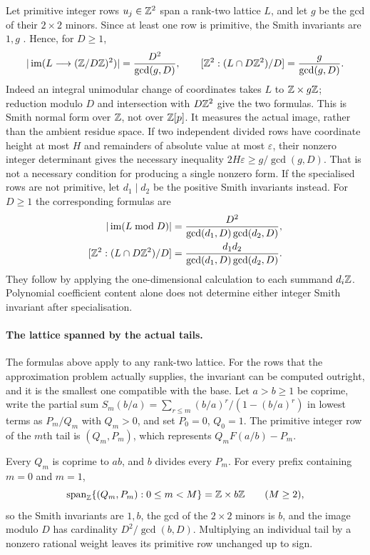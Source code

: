\documentclass[11pt]{article}
\begin{document}
Let primitive integer rows $u_j\in\mathbb{Z}^2$ span a rank-two lattice $L$, and
let $g$ be the gcd of their $2\times2$ minors. Since at least one row is
primitive, the Smith invariants are $1,g$
\cite[Thms.~2.3--2.4, p.~3]{stanley2016}. Hence, for $D\ge1$,
\[
 |\operatorname{im}(L\longrightarrow(\mathbb{Z}/D\mathbb{Z})^2)|
 =\frac{D^2}{\gcd(g,D)},\qquad
 [\mathbb{Z}^2:(L\cap D\mathbb{Z}^2)/D]=\frac{g}{\gcd(g,D)}.
\]
Indeed an integral unimodular change of coordinates takes $L$ to
$\mathbb{Z}\times g\mathbb{Z}$; reduction modulo $D$ and intersection with $D\mathbb{Z}^2$
give the two formulas. This is Smith normal form over $\mathbb{Z}$, not over
$\mathbb{Z}[p]$. It measures the actual image, rather than the ambient residue space. If two independent divided rows have coordinate height at most
$H$ and remainders of absolute value at most $\varepsilon$, their nonzero
integer determinant gives the necessary inequality
$2H\varepsilon\ge g/\gcd(g,D)$. That is not a necessary condition for
producing a single nonzero form.
If the specialised rows are not primitive, let $d_1\mid d_2$ be the
positive Smith invariants instead. For $D\ge1$ the corresponding formulas are
\[
\begin{aligned}
 |\operatorname{im}(L\bmod D)|
 &=\frac{D^2}{\gcd(d_1,D)\gcd(d_2,D)},\\
 [\Z^2:(L\cap D\Z^2)/D]
 &=\frac{d_1d_2}{\gcd(d_1,D)\gcd(d_2,D)}.
\end{aligned}
\]
They follow by applying the one-dimensional calculation to each summand
$d_i\mathbb{Z}$. Polynomial coefficient content alone does not determine either
integer Smith invariant after specialisation.

\paragraph{The lattice spanned by the actual tails.}
The formulas above apply to any rank-two lattice. For the rows that the
approximation problem actually supplies, the invariant can be computed
outright, and it is the smallest one compatible with the base. Let $a>b\ge1$ be
coprime, write the partial sum $S_m(b/a)=\sum_{r\le m}(b/a)^r/(1-(b/a)^r)$ in
lowest terms as $P_m/Q_m$ with $Q_m>0$, and set $P_0=0$, $Q_0=1$. The primitive
integer row of the $m$th tail is $(Q_m,P_m)$, which represents
$Q_mF(a/b)-P_m$.

\begin{proposition}
\label{long1049:res:tail-lattice}
Every $Q_m$ is coprime to $ab$, and $b$ divides every $P_m$. For every prefix
containing $m=0$ and $m=1$,
\[
 \operatorname{span}_{\mathbb{Z}}\{(Q_m,P_m):0\le m<M\}=\mathbb{Z}\times b\mathbb{Z}
 \qquad(M\ge2),
\]
so the Smith invariants are $1,b$, the gcd of the $2\times2$ minors is $b$, and
the image modulo $D$ has cardinality $D^2/\gcd(b,D)$. Multiplying an individual
tail by a nonzero rational weight leaves its primitive row unchanged up to
sign.
\end{proposition}
\end{document}

